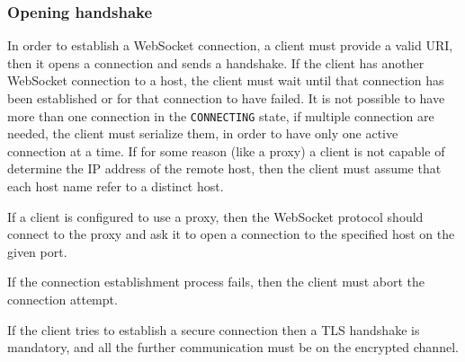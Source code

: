 \subsubsection{Opening handshake}
In order to establish a WebSocket connection, a client must provide a valid URI, then it opens a connection and sends a handshake.\newline
If the client has another WebSocket connection to a host, the client must wait until that connection has been established or for that connection to have failed.\newline
It is not possible to have more than one connection in the \texttt{CONNECTING} state, if multiple connection are needed, the client must serialize them, in order to have only one active connection at a time.\newline
If for some reason (like a proxy) a client is not capable of determine the IP address of the remote host, then the client must assume that each host name refer to a distinct host.\newline

If a client is configured to use a proxy, then the WebSocket protocol should connect to the proxy and ask it to open a connection to the specified host on the given port.\newline

If the connection establishment process fails, then the client must abort the connection attempt.\newline

If the client tries to establish a secure connection then a TLS handshake is mandatory, and all the further communication must be on the encrypted channel.\newline


